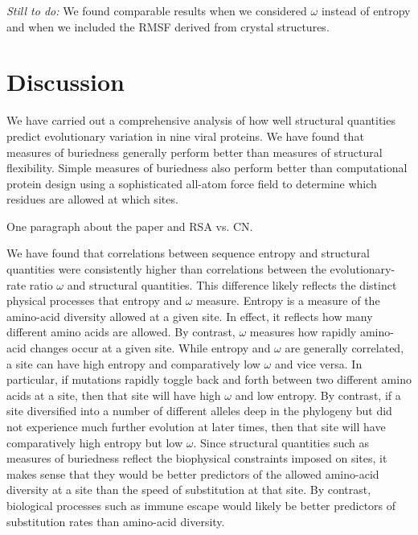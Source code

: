 \documentclass[12pt]{article}
\begin{document}
{\color{blue}\emph{Still to do:} We found comparable results when we considered $\omega$ instead of entropy and when we included the RMSF derived from crystal structures.}


\section*{Discussion}

We have carried out a comprehensive analysis of how well structural quantities predict evolutionary variation in nine viral proteins. We have found that measures of buriedness generally perform better than measures of structural flexibility. Simple measures of buriedness also perform better than computational protein design using a sophisticated all-atom force field to determine which residues are allowed at which sites. 


{\color{blue}One paragraph about the \citep{Yehetal2014} paper and RSA vs. CN.}

We have found that correlations between sequence entropy and structural quantities were consistently higher than correlations between the evolutionary-rate ratio $\omega$ and structural quantities. This difference likely reflects the distinct physical processes that entropy and $\omega$ measure. Entropy is a measure of the amino-acid diversity allowed at a given site. In effect, it reflects how many different amino acids are allowed. By contrast, $\omega$ measures how rapidly amino-acid changes occur at a given site. While entropy and $\omega$ are generally correlated, a site can have high entropy and comparatively low $\omega$ and vice versa. In particular, if mutations rapidly toggle back and forth between two different amino acids at a site, then that site will have high $\omega$ and low entropy. By contrast, if a site diversified into a number of different alleles deep in the phylogeny but did not experience much further evolution at later times, then that site will have comparatively high entropy but low $\omega$. Since structural quantities such as measures of buriedness reflect the biophysical constraints imposed on sites, it makes sense that they would be better predictors of the allowed amino-acid diversity at a site than the speed of substitution at that site. By contrast, biological processes such as immune escape would likely be better predictors of substitution rates than amino-acid diversity.
\end{document}
